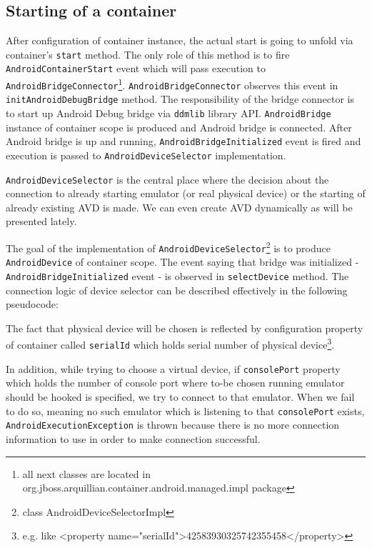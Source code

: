 \documentclass[12pt,final,oneside]{fithesis}
\begin{document}
		\subsection{Starting of a container}

After configuration of container instance, the actual start is going to unfold via container's \texttt{start} method. The only role of this method is to fire \texttt{AndroidContainerStart} event which will pass execution to \texttt{AndroidBridgeConnector}\footnote{all next classes are located in org.jboss.arquillian.container.android.managed.impl package}. \texttt{AndroidBridgeConnector} observes this event in \texttt{initAndroidDebugBridge} method. The responsibility of the bridge connector is to start up Android Debug bridge via \texttt{ddmlib} library API. \texttt{AndroidBridge} instance of container scope is produced and Android bridge is connected. After Android bridge is up and running, \texttt{AndroidBridgeInitialized} event is fired and execution is passed to \texttt{AndroidDeviceSelector} implementation.

\texttt{AndroidDeviceSelector} is the central place where the decision about the connection to already starting emulator (or real physical device) or the starting of already existing AVD is made. We can even create AVD dynamically as will be presented lately.

The goal of the implementation of \texttt{AndroidDeviceSelector}\footnote{class AndroidDeviceSelectorImpl} is to produce \texttt{AndroidDevice} of container scope. The event saying that bridge was initialized - \texttt{AndroidBridgeInitialized} event - is observed in \texttt{selectDevice} method. The connection logic of device selector can be described effectively in the following pseudocode:



The fact that physical device will be chosen is reflected by configuration property of container called \texttt{serialId} which holds serial number of physical device\footnote{e.g. like <property name="serialId">42583930325742355458</property>}.

In addition, while trying to choose a virtual device, if \texttt{consolePort} property which holds the number of console port where to-be chosen running emulator should be hooked is specified, we try to connect to that emulator. When we fail to do so, meaning no such emulator which is listening to that \texttt{consolePort} exists, \texttt{AndroidExecutionException} is thrown because there is no more connection information to use in order to make connection successful. 
\end{document}
